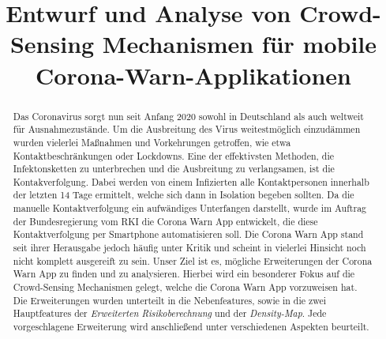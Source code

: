 \documentclass[conference,compsoc]{IEEEtran}
\begin{document}
\title{Entwurf und Analyse von Crowd-Sensing Mechanismen für mobile Corona-Warn-Applikationen}

\author{
\and
{} 
\and
{}
\and
{}
}

\maketitle

\begin{abstract}
Das Coronavirus sorgt nun seit Anfang 2020 sowohl in Deutschland als auch weltweit für Ausnahmezustände. 
Um die Ausbreitung des Virus weitestmöglich einzudämmen wurden vielerlei Maßnahmen und Vorkehrungen getroffen, wie etwa Kontaktbeschränkungen oder Lockdowns.
Eine der effektivsten Methoden, die Infektonsketten zu unterbrechen und die Ausbreitung zu verlangsamen, ist die Kontakverfolgung. 
Dabei werden von einem Infizierten alle Kontaktpersonen innerhalb der letzten 14 Tage ermittelt, welche sich dann in Isolation begeben sollten. 
Da die manuelle Kontaktverfolgung ein aufwändiges Unterfangen darstellt, wurde im Auftrag der Bundesregierung vom RKI die Corona Warn App entwickelt, die diese Kontaktverfolgung per Smartphone automatisieren soll. 
Die Corona Warn App stand seit ihrer Herausgabe jedoch häufig unter Kritik und scheint in vielerlei Hinsicht noch nicht komplett ausgereift zu sein.
Unser Ziel ist es, mögliche Erweiterungen der Corona Warn App zu finden und zu analysieren.
Hierbei wird ein besonderer Fokus auf die Crowd-Sensing Mechanismen gelegt, welche die Corona Warn App vorzuweisen hat. 
Die Erweiterungen wurden unterteilt in die Nebenfeatures, sowie in die zwei Hauptfeatures der \textit{Erweiterten Risikoberechnung} und der \textit{Density-Map}.
Jede vorgeschlagene Erweiterung wird anschließend unter verschiedenen Aspekten beurteilt. 
\end{abstract}
\end{document}
